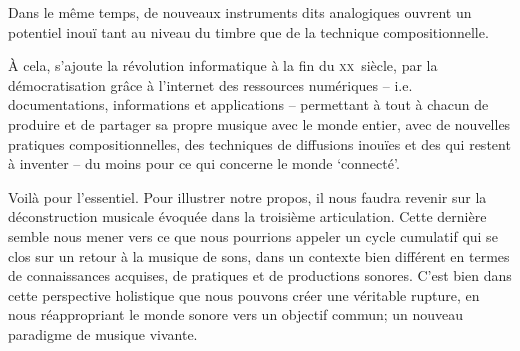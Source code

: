 \documentclass{article}
\begin{document}
Dans le même temps, de nouveaux instruments dits analogiques ouvrent un potentiel inouï tant au niveau du timbre que de la technique compositionnelle.

À cela, s'ajoute la révolution informatique à la fin du \textsc{xx}\ieme ~siècle,  par la démocratisation grâce à l'internet des ressources numériques -- i.e. documentations, informations et applications -- permettant à tout à chacun de produire et de partager sa propre musique avec le monde entier, avec de nouvelles pratiques compositionnelles, des techniques de diffusions inouïes et des qui restent à inventer -- du moins pour ce qui concerne le monde `connecté'.






\bigskip

Voilà pour l'essentiel. Pour illustrer notre propos, il nous faudra revenir sur la déconstruction musicale évoquée dans la troisième articulation. Cette dernière semble nous mener vers ce que nous pourrions appeler un cycle cumulatif qui se clos sur un retour à la musique de sons, dans un contexte bien différent en termes de connaissances acquises, de pratiques et de productions sonores. %
C'est bien dans cette perspective holistique que nous pouvons créer une véritable rupture, en nous réappropriant le monde sonore vers un objectif commun; un nouveau paradigme de musique vivante.

\bigskip

%    
  
\end{document}
